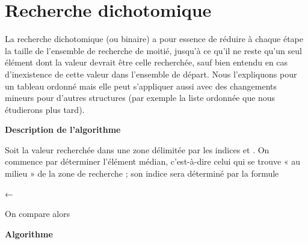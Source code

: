 \section{Recherche dichotomique}

	La recherche dichotomique (ou binaire) a pour essence de réduire à
	chaque étape la taille de l’ensemble de recherche de moitié, jusqu’à ce
	qu’il ne reste qu’un seul élément dont la valeur devrait être celle
	recherchée, sauf bien entendu en cas d’inexistence de cette valeur dans
	l’ensemble de départ. Nous l’expliquons pour un tableau ordonné mais
	elle peut s’appliquer aussi avec des changements mineurs pour
	d'autres structures (par exemple la liste ordonnée que
	nous étudierons plus tard).

	{\sffamily\bfseries\upshape
	Description de l’algorithme}

	Soit  la valeur recherchée dans une zone
	délimitée par les indices  et
	. On commence par déterminer l’élément
	médian, c’est-à-dire celui qui se trouve « au milieu » de la zone de
	recherche ; son indice sera déterminé par la formule

	{\centering
	\textsf{←}{
	}
	\par}

	On compare alors 

	{\sffamily\bfseries
	Algorithme}
	
